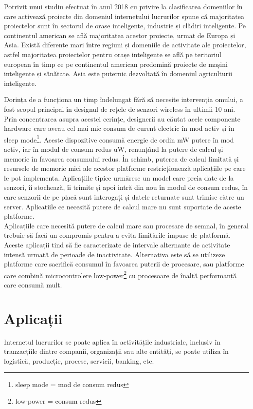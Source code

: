 \documentclass[12pt,a4paper]{report}
\begin{document}
Potrivit unui studiu efectuat în anul 2018 cu privire la clasificarea domeniilor în care activează proiecte din domeniul internetului lucrurilor spune că majoritatea proiectelor sunt în sectorul de orașe inteligente, industrie și clădiri inteligente\cite{study}. Pe continentul american se află majoritatea acestor proiecte, urmat de Europa și Asia. Există diferențe mari între regiuni și domeniile de activitate ale proiectelor, astfel majoritatea proiectelor pentru orașe inteligente se află pe teritoriul european în timp ce pe continentul american predomină proiecte de mașini inteligente și sănătate. Asia este puternic dezvoltată în domeniul agriculturii inteligente.

Dorința de a funcționa un timp îndelungat fără să necesite intervenția omului, a fost scopul principal în designul de rețele de senzori wireless în ultimii 10 ani\cite{lowpowervsperformance}. Prin concentrarea asupra acestei cerințe, designerii au căutat acele componente hardware care aveau cel mai mic consum de curent electric în mod activ și în sleep mode\footnote{sleep mode = mod de consum redus}. Aceste dispozitive consumă energie de ordin mW putere în mod activ, iar în modul de consum redus uW, renunțând la putere de calcul și memorie în favoarea consumului redus.
În schimb, puterea de calcul limitată și resursele de memorie mici ale acestor platforme restricționează aplicațiile pe care le pot implementa. Aplicațiile tipice urmăresc un model care preia date de la senzori, îi stochează, îi trimite și apoi intră din nou în modul de consum redus, în care senzorii de pe placă sunt interogați și datele returnate sunt trimise către un server. Aplicațiile ce necesită putere de calcul mare nu sunt suportate de aceste platforme. \\
Aplicațiile care necesită putere de calcul mare sau procesare de semnal, în general trebuie să facă un compromis pentru a evita limitările impuse de platformă. Aceste aplicații tind să fie caracterizate de intervale alternante de activitate intensă urmată de perioade de inactivitate. Alternativa este să se utilizeze platforme care sacrifică consumul în favoarea puterii de procesare, sau platforme care combină microcontrolere low-power\footnote{low-power = consum redus} cu procesoare de înaltă performanță care consumă mult.

\section{Aplicații}
Internetul lucrurilor se poate aplica în activitățile industriale, inclusiv în tranzacțiile dintre companii, organizații sau alte entități, se poate utiliza în logistică, producție, procese, servicii, banking, etc\cite{iotfields}.
\end{document}
